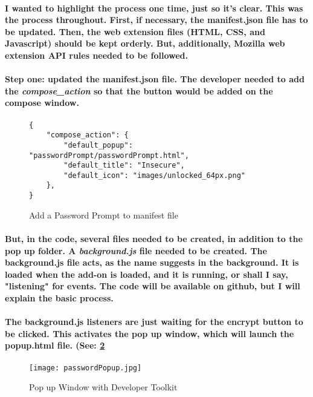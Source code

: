 \paragraph{I wanted to highlight the process one time, just so it's clear. This was the process throughout. First, if necessary, the manifest.json file has to be updated. Then, the web extension files (HTML, CSS, and Javascript) should be kept orderly. But, additionally, Mozilla web extension API rules needed to be followed.}

\paragraph{Step one: updated the manifest.json file. The developer needed to add the \emph{compose\_action} so that the button would be added on the compose window.}


\begin{figure}[H]
\centering
\begin{verbatim}
{
    "compose_action": {
        "default_popup": "passwordPrompt/passwordPrompt.html",
        "default_title": "Insecure",
        "default_icon": "images/unlocked_64px.png"
    },
}
\end{verbatim}
\caption{\label{fig: addPwToManifest} Add a Password Prompt to manifest file}
\end{figure}


\paragraph{But, in the code, several files needed to be created, in addition to the pop up folder. A \emph{background.js} file needed to be created. The background.js file acts, as the name suggests in the background. It is loaded when the add-on is loaded, and it is running, or shall I say, "listening" for events. The code will be available on github, but I will explain the basic process.}

\paragraph{The background.js listeners are just waiting for the encrypt button to be clicked. This activates the pop up window, which will launch the popup.html file. (See: \ref{fig: withButton}}

\begin{figure}[H]
    \centering
    \texttt{[image: passwordPopup.jpg]}
    \caption{\label{fig: withButton} Pop up Window with Developer Toolkit}
\end{figure}

